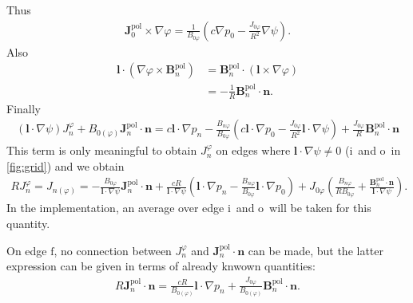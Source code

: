 \documentclass[a4paper, twoside, 10pt, english]{article}
\numberwithin{equation}{section}
\let\temp\varrho
\let\varrho\rho
\let\rho\temp
\let\temp\vartheta
\let\vartheta\theta
\let\theta\temp
\let\temp\varphi
\let\varphi\phi
\let\phi\temp
\let\vec\symbf
\newcommand*\grad{\ensuremath{\nabla}}
\newcommand*\pol{\ensuremath{\textrm{pol}}}  %
\newcommand*\fs{\ensuremath{\textrm{f}}}  %
\newcommand*\inw{\ensuremath{\textrm{i}}}  %
\newcommand*\out{\ensuremath{\textrm{o}}}  %
\begin{document}
Thus
\begin{gather}
  \vec{J}_{0}^{\pol} \times \grad \phi = \frac{1}{B_{0 \phi}} \left( c \grad p_{0} - \frac{J_{0 \phi}}{R^{2}} \grad \psi \right).
\end{gather}
Also
\begin{align}
  \vec{l} \cdot (\grad \phi \times \vec{B}_{n}^{\pol}) &= \vec{B}_{n}^{\pol} \cdot (\vec{l} \times \grad \phi) \nonumber \\
  &= -\frac{1}{R} \vec{B}_{n}^{\pol} \cdot \vec{n}.
\end{align}
Finally
\begin{gather}
  (\vec{l} \cdot \grad \psi) J_{n}^{\phi} + B_{0 (\phi)} \vec{J}_{n}^{\pol} \cdot \vec{n} = c \vec{l} \cdot \grad p_{n} - \frac{B_{n \phi}}{B_{0 \phi}} \left( c \vec{l} \cdot \grad p_{0} - \frac{J_{0 \phi}}{R^{2}} \vec{l} \cdot \grad \psi \right) + \frac{J_{0 \phi}}{R} \vec{B}_{n}^{\pol} \cdot \vec{n} \label{eq:jnphi-jnpol}
\end{gather}
This term is only meaningful to obtain $J_{n}^{\phi}$ on edges where $\vec{l} \cdot \grad \psi \neq 0$ (\inw\ and \out\ in \cref{fig:grid}) and we obtain
\begin{gather}
  R J_{n}^{\phi} = J_{n (\phi)} = -\frac{B_{0 \phi}}{\vec{l} \cdot \grad \psi} \vec{J}_{n}^{\pol} \cdot \vec{n} + \frac{c R}{\vec{l} \cdot \grad \psi} \left( \vec{l} \cdot \grad p_{n} - \frac{B_{n \phi}}{B_{0 \phi}} \vec{l} \cdot \grad p_{0} \right) + J_{0 \phi} \left( \frac{B_{n \phi}}{R B_{0 \phi}} + \frac{\vec{B}_{n}^{\pol} \cdot \vec{n}}{\vec{l} \cdot \grad \psi} \right). \label{eq:jnphi}
\end{gather}
In the implementation, an average over edge \inw\ and \out\ will be taken for this quantity.

On edge \fs, no connection between $J_{n}^{\phi}$ and $\vec{J}_{n}^{\pol} \cdot \vec{n}$ can be made, but the latter expression can be given in terms of already knwown quantities:
\begin{gather}
  R \vec{J}_{n}^{\pol} \cdot \vec{n} = \frac{c R}{B_{0 (\phi)}} \vec{l} \cdot \grad p_{n} + \frac{J_{0 \phi}}{B_{0 (\phi)}} \vec{B}_{n}^{\pol} \cdot \vec{n}. \label{eq:If}
\end{gather}
\end{document}
